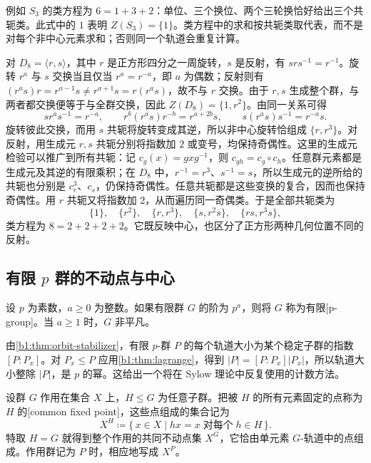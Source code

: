 例如 \(S_3\) 的类方程为 \(6=1+3+2\)：单位、三个换位、两个三轮换恰好给出三个共轭类。此式中的 \(1\) 表明 \(Z(S_3)=\{1\}\)。类方程中的求和按共轭类取代表，而不是对每个非中心元素求和；否则同一个轨道会重复计算。

\ProseParagraphBreak
对 \(D_8=\langle r,s\rangle\)，其中 \(r\) 是正方形四分之一周旋转，\(s\) 是反射，有 \(srs^{-1}=r^{-1}\)。旋转 \(r^a\) 与 \(s\) 交换当且仅当 \(r^a=r^{-a}\)，即 \(a\) 为偶数；反射则有 \((r^as)r=r^{a-1}s\ne r^{a+1}s=r(r^as)\)，故不与 \(r\) 交换。由于 \(r,s\) 生成整个群，与两者都交换便等于与全群交换，因此 \(Z(D_8)=\{1,r^2\}\)。由同一关系可得
\[
	sr^as^{-1}=r^{-a},\qquad r^b(r^as)r^{-b}=r^{a+2b}s,\qquad s(r^as)s^{-1}=r^{-a}s.
\]
旋转彼此交换，而用 \(s\) 共轭将旋转变成其逆，所以非中心旋转恰组成 \(\{r,r^3\}\)。对反射，用生成元 \(r,s\) 共轭分别将指数加 \(2\) 或变号，均保持奇偶性。这里的生成元检验可以推广到所有共轭：记 \(c_g(x)=gxg^{-1}\)，则 \(c_{gh}=c_g\circ c_h\)。任意群元素都是生成元及其逆的有限乘积；在 \(D_8\) 中，\(r^{-1}=r^3\)、\(s^{-1}=s\)，所以生成元的逆所给的共轭也分别是 \(c_r^3\)、\(c_s\)，仍保持奇偶性。任意共轭都是这些变换的复合，因而也保持奇偶性。用 \(r\) 共轭又将指数加 \(2\)，从而遍历同一奇偶类。于是全部共轭类为
\[
	\{1\},\quad \{r^2\},\quad \{r,r^3\},\quad \{s,r^2s\},\quad \{rs,r^3s\},
\]
类方程为 \(8=2+2+2+2\)。它既反映中心，也区分了正方形两种几何位置不同的反射。

\subsection{有限 \texorpdfstring{\(p\)}{p} 群的不动点与中心}
\label{b1:subsec:0402:03}

\begin{definition}\label{b1:def:p-group}
	设 \(p\) 为素数，\(a\geq0\) 为整数。如果有限群 \(G\) 的阶为 \(p^a\)，则将 \(G\) 称为有限[p-group]。当 \(a\geq1\) 时，\(G\) 非平凡。
\end{definition}

由\cref{b1:thm:orbit-stabilizer}，有限 \(p\)-群 \(P\) 的每个轨道大小为某个稳定子群的指数 \([P:P_x]\)。对 \(P_x\leq P\) 应用\cref{b1:thm:lagrange}，得到 \(|P|=[P:P_x]|P_x|\)，所以轨道大小整除 \(|P|\)，是 \(p\) 的幂。这给出一个将在 Sylow 理论中反复使用的计数方法。

\ProseParagraphBreak
设群 \(G\) 作用在集合 \(X\) 上，\(H\leq G\) 为任意子群。把被 \(H\) 的所有元素固定的点称为 \(H\) 的[common fixed point]，这些点组成的集合记为
\[
	X^H\coloneqq\{\,x\in X\mid hx=x\;\text{对每个}\;h\in H\,\}.
\]
特取 \(H=G\) 就得到整个作用的共同不动点集 \(X^G\)，它恰由单元素 \(G\)-轨道中的点组成。作用群记为 \(P\) 时，相应地写成 \(X^P\)。

